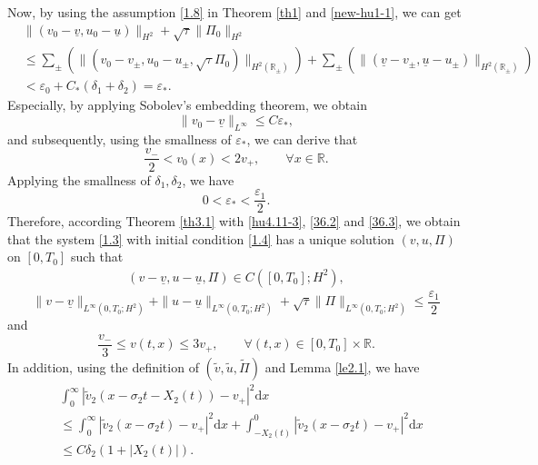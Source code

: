 \documentclass[10pt,reqno]{amsart}
\numberwithin{equation}{section}
\newcommand{\dif}{\mathrm{d}}
\begin{document}
Now, by using the assumption \eqref{1.8} in Theorem \ref{th1} and \eqref{new-hu1-1}, we can get
\begin{equation}\label{hu4.11-3}
\begin{aligned}
&\|(v_0-\underline{v},u_0-\underline{u})\|_{H^2}
+\sqrt{\tau}\|\Pi_0\|_{H^2}\\
&\le\sum\limits_{\pm}\left(\|(v_0-v_{\pm},u_0-u_{\pm},\sqrt{\tau}\Pi_0)\|_{H^2(\mathbb{R}_{\pm})}\right)
+\sum\limits_{\pm}\left(\|(\underline{v}-v_{\pm},\underline{u}-u_{\pm})\|_{H^2(\mathbb{R}_{\pm})}\right)
\\
&<\varepsilon_0+C_{\ast}(\delta_1+\delta_2)=\varepsilon_\ast.
\end{aligned}
\end{equation}
Especially, by applying Sobolev's embedding theorem, we obtain
\[
\|v_0-\underline{v}\|_{L^\infty}\le C\varepsilon_\ast,
\]
and subsequently, using the smallness of $\varepsilon_\ast$, we can derive that
\begin{equation}\label{36.2}
\frac{v_-}{2}<v_0(x)<2v_+,\qquad \forall x\in\mathbb{R}.
\end{equation}
Applying the smallness of $\delta_1, \delta_2$, we have
\begin{equation}\label{36.3}
0<\varepsilon_\ast<\frac{\varepsilon_1}{2}.
\end{equation}
Therefore, according Theorem \ref{th3.1} with \eqref{hu4.11-3}, \eqref{36.2} and \eqref{36.3}, we obtain that the system \eqref{1.3} with initial condition \eqref{1.4} has a unique solution $(v, u, \Pi)$ on $[0,T_0]$ such that
\begin{equation}\label{36.9}
\begin{aligned}
(v-\underline{v}, u-\underline{u}, \Pi)\in C([0,T_0];H^2),
\end{aligned}
\end{equation}
\begin{equation}\label{36.7}
\|v-\underline{v}\|_{L^{\infty}(0,T_0;H^2)}+\|u-\underline{u}\|_{L^{\infty}(0,T_0;H^2)}
+\sqrt{\tau}\|\Pi\|_{L^{\infty}(0,T_0;H^2)}\leq \frac{\varepsilon_1}{2}
\end{equation}
and
\begin{equation}\label{36.5}
\frac{v_-}{3}\leq v(t,x)\leq 3v_+,\qquad \forall(t,x)\in[0,T_0]\times\mathbb{R}.
\end{equation}
In addition, using the definition of $(\widetilde{v}, \widetilde{u}, \widetilde{\Pi})$ and Lemma \ref{le2.1}, we have
\[
\begin{aligned}
&\int_0^\infty |\widetilde{v}_2(x-\sigma_2 t-X_2(t))-v_+|^2\dif x\\
&\le \int_0^\infty |\widetilde{v}_2(x-\sigma_2 t)-v_+|^2\dif x
+\int_{-X_2(t)}^0 |\widetilde{v}_2(x-\sigma_2 t)-v_+|^2\dif x\\
&\le C\delta_2(1+|X_2(t)|).
\end{aligned}
\]
\end{document}
